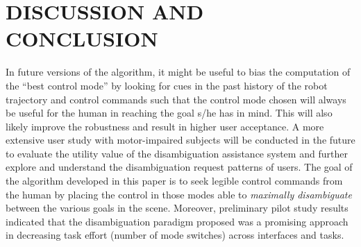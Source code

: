 \documentclass[conference]{IEEEtran}
\begin{document}
\section{DISCUSSION AND CONCLUSION}
 In future versions of the algorithm, it might be useful to bias the computation of the ``best control mode'' by looking for cues in the past history of the robot trajectory and control commands such that the control mode chosen will always be useful for the human in reaching the goal s/he has in mind. This will also likely improve the robustness and result in higher user acceptance. 
A more extensive user study with motor-impaired subjects will be conducted in the future to evaluate the utility value of the disambiguation assistance system and further explore and understand the disambiguation request patterns of users. The goal of the algorithm developed in this paper is to seek legible control commands from the human by placing the control in those modes able to \textit{maximally disambiguate} between the various goals in the scene.  Moreover, preliminary pilot study results indicated that the disambiguation paradigm proposed was a promising approach in decreasing task effort (number of mode switches) across interfaces and tasks. 
\end{document}
